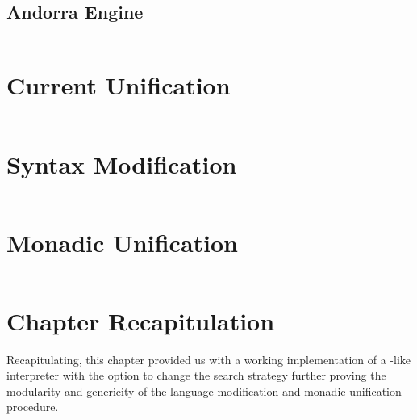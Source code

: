 \documentclass[thesis-solanki.tex]{files}
\begin{document}
\subsection{Andorra Engine}
\begin{singlespace}
\inputminted[linenos, firstline=29, lastline=75]{haskell}{haskell-proto3-diatomic-unbank.hs}
\end{singlespace}

\section{Current Unification}
\begin{singlespace}
  \inputminted[linenos, firstline=65, lastline=82]{haskell}{haskell-proto3-pentyl-skater.hs}
\end{singlespace}


\section{Syntax Modification}
\begin{singlespace}
  \inputminted[linenos, lastline=352]{haskell}{haskell-proto3-uplift-apart.hs}
\end{singlespace}

\section{Monadic Unification}
\begin{singlespace}
  \inputminted[linenos]{haskell}{haskell-proto3-bevy-icebox.hs}
\end{singlespace}


\section{Chapter Recapitulation}
Recapitulating, this chapter provided us with a working implementation of a -like interpreter with the option to change
the search strategy further proving the modularity and genericity of the language modification and monadic unification procedure.
\end{document}
